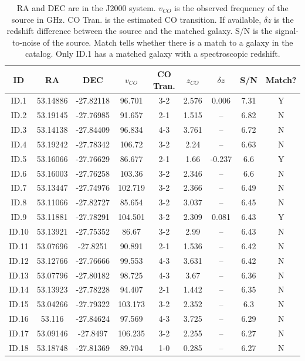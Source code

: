 \begin{table}
\centering
\caption{RA and DEC are in the J2000 system. $v_{CO}$ is the observed frequency of the source in GHz. CO Tran. is the estimated CO transition. If available, $\delta z$ is the redshift difference between the source and the matched galaxy. S/N is the signal-to-noise of the source. Match tells whether there is a match to a galaxy in the catalog. Only ID.1 has a matched galaxy with a spectroscopic redshift.}
\begin{tabular}{ccccccccc}
ID & RA & DEC & $v_{CO}$ & CO Tran. & $z_{CO}$ & $\delta z$ & S/N & Match? \\
\hline
ID.1 & 53.14886 & -27.82118 & 96.701 & 3-2 & 2.576 & 0.006 & 7.31 & Y \\
ID.2 & 53.19145 & -27.76985 & 91.657 & 2-1 & 1.515 & -- & 6.82 & N \\
ID.3 & 53.14138 & -27.84409 & 96.834 & 4-3 & 3.761 & -- & 6.72 & N \\
ID.4 & 53.19242 & -27.78342 & 106.72 & 3-2 & 2.24 & -- & 6.63 & N \\
ID.5 & 53.16066 & -27.76629 & 86.677 & 2-1 & 1.66 & -0.237 & 6.6 & Y \\
ID.6 & 53.16003 & -27.76258 & 103.36 & 3-2 & 2.346 & -- & 6.6 & N \\
ID.7 & 53.13447 & -27.74976 & 102.719 & 3-2 & 2.366 & -- & 6.49 & N \\
ID.8 & 53.11066 & -27.82727 & 85.654 & 3-2 & 3.037 & -- & 6.45 & N \\
ID.9 & 53.11881 & -27.78291 & 104.501 & 3-2 & 2.309 & 0.081 & 6.43 & Y \\
ID.10 & 53.13921 & -27.75352 & 86.67 & 3-2 & 2.99 & -- & 6.43 & N \\
ID.11 & 53.07696 & -27.8251 & 90.891 & 2-1 & 1.536 & -- & 6.42 & N \\
ID.12 & 53.12766 & -27.76666 & 99.553 & 4-3 & 3.631 & -- & 6.42 & N \\
ID.13 & 53.07796 & -27.80182 & 98.725 & 4-3 & 3.67 & -- & 6.36 & N \\
ID.14 & 53.13923 & -27.78228 & 94.407 & 2-1 & 1.442 & -- & 6.35 & N \\
ID.15 & 53.04266 & -27.79322 & 103.173 & 3-2 & 2.352 & -- & 6.3 & N \\
ID.16 & 53.116 & -27.84624 & 97.569 & 4-3 & 3.725 & -- & 6.29 & N \\
ID.17 & 53.09146 & -27.8497 & 106.235 & 3-2 & 2.255 & -- & 6.27 & N \\
ID.18 & 53.18748 & -27.81369 & 89.704 & 1-0 & 0.285 & -- & 6.27 & N \\

\end{tabular}
\end{table}
